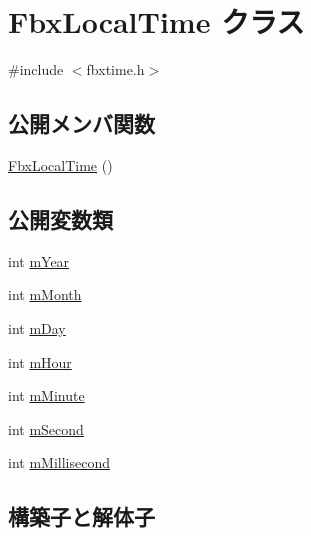 \hypertarget{class_fbx_local_time}{}\section{Fbx\+Local\+Time クラス}
\label{class_fbx_local_time}


{\ttfamily \#include $<$fbxtime.\+h$>$}

\subsection*{公開メンバ関数}
\begin{DoxyCompactItemize}
\item 
\hyperlink{class_fbx_local_time_a2e58f18360c183ab9f844ab79a8fa026}{Fbx\+Local\+Time} ()
\end{DoxyCompactItemize}
\subsection*{公開変数類}
\begin{DoxyCompactItemize}
\item 
int \hyperlink{class_fbx_local_time_a824c8b3c8dcab952b4e75436e696c519}{m\+Year}
\item 
int \hyperlink{class_fbx_local_time_ab952f33eb09aaace10187d943f16331e}{m\+Month}
\item 
int \hyperlink{class_fbx_local_time_a1ce97711f03bbf4af9cb03616468bf2b}{m\+Day}
\item 
int \hyperlink{class_fbx_local_time_addcd36b883d1d12ae3ac4a1970b2b03d}{m\+Hour}
\item 
int \hyperlink{class_fbx_local_time_afe3483e57271409b93ab1523a4b02c53}{m\+Minute}
\item 
int \hyperlink{class_fbx_local_time_a5ebbe9a0fb42e63790c1bb2d4844b86c}{m\+Second}
\item 
int \hyperlink{class_fbx_local_time_a06cda6f73301118df828834a97e870a2}{m\+Millisecond}
\end{DoxyCompactItemize}


\subsection{構築子と解体子}
\mbox{\label{class_fbx_local_time_a2e58f18360c183ab9f844ab79a8fa026}} 
